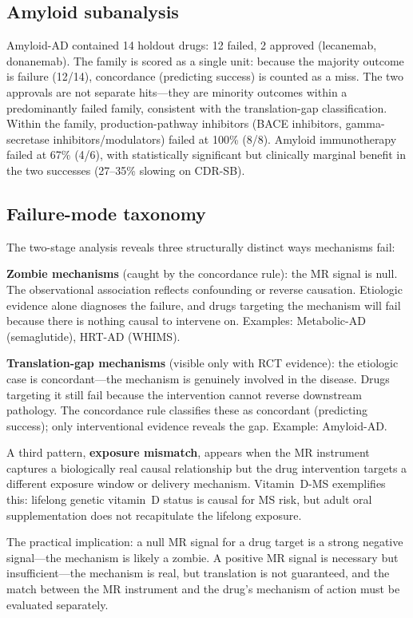\documentclass[11pt]{article}
\begin{document}
\subsection{Amyloid subanalysis}

Amyloid-AD contained 14 holdout drugs: 12 failed, 2 approved (lecanemab, donanemab). The family is scored as a single unit: because the majority outcome is failure (12/14), concordance (predicting success) is counted as a miss. The two approvals are not separate hits---they are minority outcomes within a predominantly failed family, consistent with the translation-gap classification. Within the family, production-pathway inhibitors (BACE inhibitors, gamma-secretase inhibitors/modulators) failed at 100\% (8/8). Amyloid immunotherapy failed at 67\% (4/6), with statistically significant but clinically marginal benefit in the two successes (27--35\% slowing on CDR-SB).

\subsection{Failure-mode taxonomy}
\label{sec:two_modes}

The two-stage analysis reveals three structurally distinct ways mechanisms fail:

\textbf{Zombie mechanisms} (caught by the concordance rule): the MR signal is null. The observational association reflects confounding or reverse causation. Etiologic evidence alone diagnoses the failure, and drugs targeting the mechanism will fail because there is nothing causal to intervene on. Examples: Metabolic-AD (semaglutide), HRT-AD (WHIMS).

\textbf{Translation-gap mechanisms} (visible only with RCT evidence): the etiologic case is concordant---the mechanism is genuinely involved in the disease. Drugs targeting it still fail because the intervention cannot reverse downstream pathology. The concordance rule classifies these as concordant (predicting success); only interventional evidence reveals the gap. Example: Amyloid-AD.

A third pattern, \textbf{exposure mismatch}, appears when the MR instrument captures a biologically real causal relationship but the drug intervention targets a different exposure window or delivery mechanism. Vitamin~D-MS exemplifies this: lifelong genetic vitamin~D status is causal for MS risk, but adult oral supplementation does not recapitulate the lifelong exposure.

The practical implication: a null MR signal for a drug target is a strong negative signal---the mechanism is likely a zombie. A positive MR signal is necessary but insufficient---the mechanism is real, but translation is not guaranteed, and the match between the MR instrument and the drug's mechanism of action must be evaluated separately.
\end{document}
